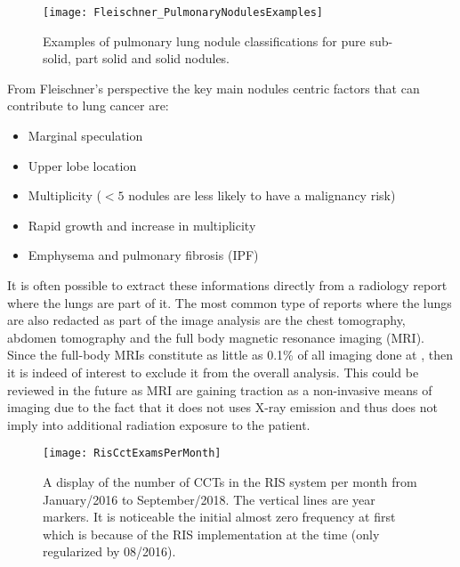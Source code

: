 \begin{center}
\begin{figure}
\begin{centering}
\texttt{[image: Fleischner\_PulmonaryNodulesExamples]}
\par\end{centering}
\caption{\label{figh:fleischner_pulmonary_nodules_examples}Examples of pulmonary lung nodule classifications for pure sub-solid, part solid and solid nodules.}
\end{figure}
\vspace*{-38pt}
\end{center}

From Fleischner's perspective the key main nodules centric factors that can contribute to lung cancer are:

\begin{itemize}
  \item Marginal speculation 
  \item Upper lobe location
  \item Multiplicity ($<5$ nodules are less likely to have a malignancy risk)
  \item Rapid growth and increase in multiplicity
  \item Emphysema and pulmonary fibrosis (IPF)
\end{itemize}

It is often possible to extract these informations directly from a radiology report where the lungs are part of it. The most common type of reports where the lungs are also redacted as part of the image analysis are the chest tomography, abdomen tomography and the full body magnetic resonance imaging (MRI). Since the full-body MRIs constitute as little as 0.1\% of all imaging done at \nomeHslShort{}, then it is indeed of interest to exclude it from the overall analysis. This could be reviewed in the future as MRI are gaining traction as a non-invasive means of imaging due to the fact that it does not uses X-ray emission and thus does not imply into additional radiation exposure to the patient.

\begin{center}
\begin{figure}
\begin{centering}
\texttt{[image: RisCctExamsPerMonth]}
\end{centering}
\caption{\label{fig:ris_cct_per_month}A display of the number of CCTs in the RIS system per month from January/2016 to September/2018. The vertical lines are year markers. It is noticeable the initial almost zero frequency at first which is because of the RIS implementation at the time (only regularized by 08/2016).}
\end{figure}
\vspace*{-38pt}
\end{center}
